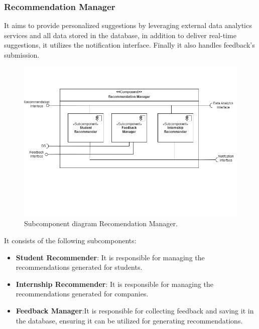 \subsubsection{Recommendation Manager} It aims to provide personalized suggestions by leveraging external data analytics services and all data stored in the database, in addition to deliver real-time suggestions, it utilizes the notification interface. Finally it also handles feedback's submission.
 \begin{figure}[H]
    \centering
    \includegraphics[width=\linewidth]{DD/Images/Comp&Sub/ReccomandationManager.png}
    \caption{Subcomponent diagram Recomendation Manager.}
    \label{fig:reccomendation_manager}
    \end{figure}

    It consists of the following subcomponents:
\begin{itemize}
    \item  \textbf{Student Recommender}: It is responsible for managing the recommendations generated for students.
    \item  \textbf{Internship Recommender}: It is responsible for managing the recommendations generated for companies.
    \item  \textbf{Feedback Manager}:It is responsible for collecting feedback and saving it in the database, ensuring it can be utilized for generating recommendations.
    \end{itemize}
    
 \clearpage %
